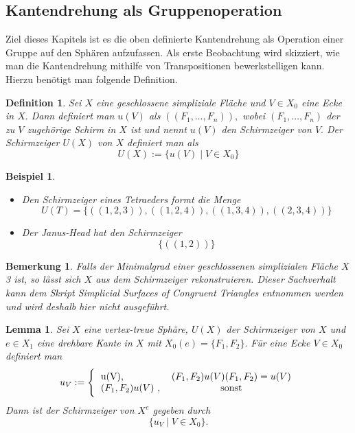 \documentclass[12pt,titlepage,twoside,cleardoublepage]{article}
\theoremstyle{nummermitklammern}
\newtheorem{lemma}[temp]{Lemma}
\newtheorem{bsp}[temp]{Beispiel}
\newtheorem{definition}[temp]{Definition}
\newtheorem{bemerkung}[temp]{Bemerkung}
\newtheorem{definition}[zahl]{Definition}
\newtheorem{lemma}[zahl]{Lemma}
\newtheorem{bsp}[zahl]{Beispiel}
\newtheorem{bemerkung}[zahl]{Bemerkung}
\numberwithin{equation}{section}
\begin{document}
\subsection{Kantendrehung als Gruppenoperation}
Ziel dieses Kapitels ist es die oben definierte Kantendrehung als Operation einer Gruppe auf den Sphären aufzufassen. Als erste Beobachtung wird skizziert, wie man die Kantendrehung mithilfe von Transpositionen bewerkstelligen kann. Hierzu benötigt man folgende Definition. 
\begin{definition}
Sei $X$ eine geschlossene simpliziale Fläche und $V\in X_0$ eine Ecke in $X.$ Dann definiert man $u(V)$ als $((F_1, \ldots , F_n)),$ wobei $(F_1,\ldots,F_n)$ der zu $V$ zugehörige Schirm in $X$ ist und nennt $u(V)$ den \emph{Schirmzeiger} von $V.$ Der \emph{Schirmzeiger} $U(X)$ von $X$ definiert man als 
\[
U(X):=\{u(V) \mid V\in X_0\}
\]
\end{definition}
\begin{bsp}
\begin{itemize}
\item 
Den Schirmzeiger eines Tetraeders formt die Menge 
\[
U(T)=\{ ((1,2,3)),((1,2,4)),((1,3,4)),((2,3,4))\}
\]
\item Der Janus-Head hat den Schirmzeiger 
\[
\{((1,2))\}
\]
\end{itemize}
\end{bsp}
\begin{bemerkung}
Falls der Minimalgrad einer geschlossenen simplizialen Fläche $X$ 3 ist, so lässt sich $X$ aus dem Schirmzeiger rekonstruieren. Dieser Sachverhalt kann dem Skript \emph{Simplicial Surfaces of Congruent Triangles} entnommen werden und wird deshalb hier nicht ausgeführt.
\end{bemerkung}
\begin{lemma}
Sei $X$ eine vertex-treue Sphäre, $U(X)$ der Schirmzeiger von $X$ und $e\in X_1$ eine drehbare Kante in $X$ mit $X_0(e)=\{F_1,F_2\}.$ Für eine Ecke $V\in X_0$ definiert man  
\[
u_V:=
\Biggl\{
\begin{tabular}[l]{lcr}
u(V),& $(F_1,F_2)u(V)(F_1,F_2)=u(V)$ \\
$(F_1,F_2) u(V)$ ,& sonst \\

\end{tabular}
\]
Dann ist der Schirmzeiger von $X^e$ gegeben durch 
\[
\{ u_V\mid V \in X_0\}.
\]
\end{lemma}
\end{document}
